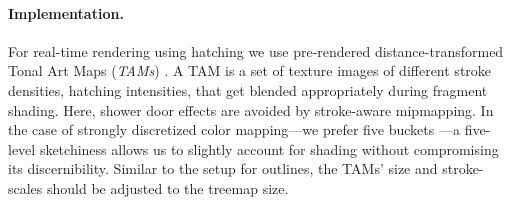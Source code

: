 \paragraph{Implementation.}
For real-time rendering using hatching we use pre-rendered distance-transformed Tonal Art Maps (\emph{TAMs}) \cite{Praun2001}.
A TAM is a set of texture images of different stroke densities, \ie hatching intensities, that get blended appropriately during fragment shading. 
Here, shower door effects are avoided by stroke-aware mipmapping.
In the case of strongly discretized color mapping---we prefer five buckets \cite{Boukhelifa2012}---a five-level sketchiness allows us to slightly account for shading without compromising its discernibility.
Similar to the setup for outlines, the TAMs' size and stroke-scales should be adjusted to the treemap size.

